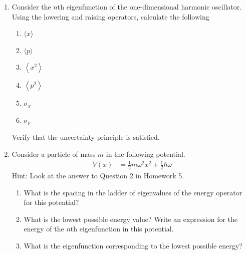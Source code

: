 \documentclass[fleqn, a4paper, 11pt, oneside]{amsart}
\theoremstyle{definition}
\theoremstyle{theorem}
\begin{document}
\begin{question}
	\begin{enumerate}
		\item
			Consider the $n$th eigenfunction of the one-dimensional harmonic oscillator.
			Using the lowering and raising operators, calculate the following
			\begin{enumerate}
				\item $\langle x \rangle$
				\item $\langle p \rangle$
				\item $\left\langle x^2 \right\rangle$
				\item $\left\langle p^2 \right\rangle$
				\item $\sigma_x$
				\item $\sigma_p$
			\end{enumerate}
			Verify that the uncertainty principle is satisfied.
		\item
			Consider a particle of mass $m$ in the following potential.
			\begin{align*}
				V(x) & = \frac{1}{2} m \omega^2 x^2 + \frac{1}{2} \hbar \omega
			\end{align*}
			Hint: Look at the answer to Question 2 in Homework 5.
			\begin{enumerate}
				\item
					What is the spacing in the ladder of eigenvalues of the energy operator for this potential?
				\item
					What is the lowest possible energy value?
					Write an expression for the energy of the $n$th eigenfunction in this potential.
				\item
					What is the eigenfunction corresponding to the lowest possible energy?
			\end{enumerate}
	\end{enumerate}
\end{question}
\end{document}
